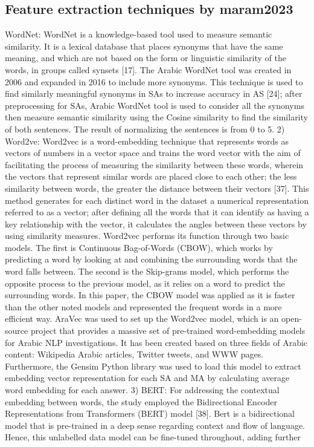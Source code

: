 \documentclass{article}
\begin{document}
\subsection{Feature extraction techniques by maram2023}
WordNet: WordNet is a knowledge-based tool used to 
measure semantic similarity. It is a lexical database that places
synonyms that have the same meaning, and which are not 
based on the form or linguistic similarity of the words, in 
groups called synsets [17]. The Arabic WordNet tool was 
created in 2006 and expanded in 2016 to include more 
synonyms. This technique is used to find similarly meaningful 
synonyms in SAs to increase accuracy in AS [24]; after preprocessing for SAs, Arabic WordNet tool is used to consider 
all the synonyms then measure semantic similarity using the 
Cosine similarity to find the similarity of both sentences. The 
result of normalizing the sentences is from 0 to 5.
2) Word2ve: Word2vec is a word-embedding technique
that represents words as vectors of numbers in a vector space 
and trains the word vector with the aim of facilitating the 
process of measuring the similarity between these words, 
wherein the vectors that represent similar words are placed 
close to each other; the less similarity between words, the
greater the distance between their vectors [37]. This method 
generates for each distinct word in the dataset a numerical 
representation referred to as a vector; after defining all the 
words that it can identify as having a key relationship with the 
vector, it calculates the angles between these vectors by using 
similarity measures. Word2vec performs its function through 
two basic models. The first is Continuous Bag-of-Words
(CBOW), which works by predicting a word by looking at and 
combining the surrounding words that the word falls between. 
The second is the Skip-grams model, which performs the 
opposite process to the previous model, as it relies on a word 
to predict the surrounding words.
In this paper, the CBOW model was applied as it is faster 
than the other noted models and represented the frequent 
words in a more efficient way. AraVec was used to set up the 
Word2vec model, which is an open-source project that 
provides a massive set of pre-trained word-embedding models 
for Arabic NLP investigations. It has been created based on 
three fields of Arabic content: Wikipedia Arabic articles, 
Twitter tweets, and WWW pages. Furthermore, the Gensim 
Python library was used to load this model to extract 
embedding vector representation for each SA and MA by 
calculating average word embedding for each answer.
3) BERT: For addressing the contextual embedding 
between words, the study employed the Bidirectional Encoder 
Representations from Transformers (BERT) model [38]. Bert 
is a bidirectional model that is pre-trained in a deep sense 
regarding context and flow of language. Hence, this unlabelled 
data model can be fine-tuned throughout, adding further
\end{document}
